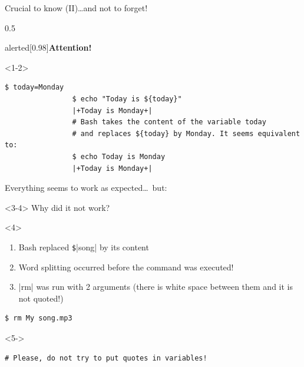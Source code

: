\begin{frame}[fragile]{Crucial to know (II)}{\ldots{}and not to forget!}
    \begin{overlayarea}{\textwidth}{0.5\textheight}
        \vspace{-5mm}
        \begin{varblock}{alerted}[0.98\textwidth]{\textbf{Attention!}}
        \end{varblock}
        \vspace{1mm}
        \begin{onlyenv}<1-2>
            \begin{lstlisting}[style=MyBash, belowskip=-4mm]
                $ today=Monday
                $ echo "Today is ${today}"
                |+Today is Monday+|
                # Bash takes the content of the variable today
                # and replaces ${today} by Monday. It seems equivalent to:
                $ echo Today is Monday
                |+Today is Monday+|
            \end{lstlisting}
            \centerline{Everything seems to work as expected\ldots\ but:}
        \end{onlyenv}
        \begin{onlyenv}<3-4>
            Why did it not work?
        \end{onlyenv}
        \begin{onlyenv}<4>
            \begin{enumerate}
                \item Bash replaced \texttt{\$}\bash|{song}| by its content
                \item Word splitting occurred before the command was executed!
                \item \bash|rm| was run with 2 arguments (there is white space between them and it is not quoted!)
            \end{enumerate}
            \begin{lstlisting}[style=MyBash, numbers=none, aboveskip=2mm]
                $ rm My song.mp3
            \end{lstlisting}
        \end{onlyenv}
        \begin{onlyenv}<5->
            \begin{lstlisting}[style=MyBash, aboveskip=2mm]
                # Please, do not try to put quotes in variables!

\end{lstlisting}
\end{onlyenv}
\end{overlayarea}
\end{frame}
